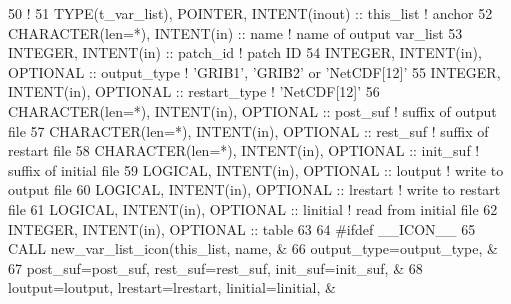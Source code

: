 \begin{DoxyCode}
50     \textcolor{comment}{!}
51     \textcolor{keywordtype}{TYPE}(t\_var\_list), \textcolor{keywordtype}{POINTER}, \textcolor{keywordtype}{INTENT(inout)} :: this\_list    \textcolor{comment}{! anchor}
52     \textcolor{keywordtype}{CHARACTER(len=*)}, \textcolor{keywordtype}{INTENT(in)}             :: name         \textcolor{comment}{! name of output var\_list}
53     \textcolor{keywordtype}{INTEGER},          \textcolor{keywordtype}{INTENT(in)}             :: patch\_id     \textcolor{comment}{! patch ID}
54     \textcolor{keywordtype}{INTEGER},          \textcolor{keywordtype}{INTENT(in)}, \textcolor{keywordtype}{OPTIONAL}   :: output\_type  \textcolor{comment}{! 'GRIB1', 'GRIB2' or 'NetCDF[12]'}
55     \textcolor{keywordtype}{INTEGER},          \textcolor{keywordtype}{INTENT(in)}, \textcolor{keywordtype}{OPTIONAL}   :: restart\_type \textcolor{comment}{! 'NetCDF[12]'}
56     \textcolor{keywordtype}{CHARACTER(len=*)}, \textcolor{keywordtype}{INTENT(in)}, \textcolor{keywordtype}{OPTIONAL}   :: post\_suf     \textcolor{comment}{! suffix of output file}
57     \textcolor{keywordtype}{CHARACTER(len=*)}, \textcolor{keywordtype}{INTENT(in)}, \textcolor{keywordtype}{OPTIONAL}   :: rest\_suf     \textcolor{comment}{! suffix of restart file}
58     \textcolor{keywordtype}{CHARACTER(len=*)}, \textcolor{keywordtype}{INTENT(in)}, \textcolor{keywordtype}{OPTIONAL}   :: init\_suf     \textcolor{comment}{! suffix of initial file}
59     \textcolor{keywordtype}{LOGICAL},          \textcolor{keywordtype}{INTENT(in)}, \textcolor{keywordtype}{OPTIONAL}   :: loutput      \textcolor{comment}{! write to  output file}
60     \textcolor{keywordtype}{LOGICAL},          \textcolor{keywordtype}{INTENT(in)}, \textcolor{keywordtype}{OPTIONAL}   :: lrestart     \textcolor{comment}{! write to restart file}
61     \textcolor{keywordtype}{LOGICAL},          \textcolor{keywordtype}{INTENT(in)}, \textcolor{keywordtype}{OPTIONAL}   :: linitial     \textcolor{comment}{! read from initial file}
62     \textcolor{keywordtype}{INTEGER},          \textcolor{keywordtype}{INTENT(in)}, \textcolor{keywordtype}{OPTIONAL}   :: table
63 
64 \textcolor{preprocessor}{#ifdef \_\_ICON\_\_}
65 \textcolor{preprocessor}{}    \textcolor{keyword}{CALL }new\_var\_list\_icon(this\_list, name,                                    &
66                       output\_type=output\_type,                                 &
67                       post\_suf=post\_suf, rest\_suf=rest\_suf, init\_suf=init\_suf, &
68                       loutput=loutput, lrestart=lrestart, linitial=linitial,   &

\end{DoxyCode}
